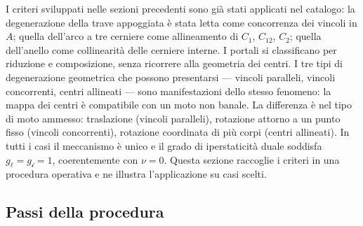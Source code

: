 I criteri sviluppati nelle sezioni precedenti sono già
stati applicati nel catalogo: la degenerazione della trave
appoggiata è stata letta come concorrenza dei vincoli in
$A$; quella dell'arco a tre cerniere come allineamento di
$C_1$, $C_{12}$, $C_2$; quella dell'anello come collinearità
delle cerniere interne. I portali si classificano per
riduzione e composizione, senza ricorrere alla geometria
dei centri. I tre tipi di degenerazione geometrica che
possono presentarsi --- vincoli paralleli,\label{sec:vincoli_paralleli}
vincoli concorrenti,\label{sec:vincoli_concorrenti}
centri allineati\label{sec:centri_allineati} ---
sono manifestazioni dello stesso fenomeno: la mappa
dei centri è compatibile con un moto non banale.
La differenza è nel tipo di moto ammesso: traslazione
(vincoli paralleli), rotazione attorno a un punto fisso
(vincoli concorrenti), rotazione coordinata di più corpi
(centri allineati). In tutti i casi il meccanismo è unico
e il grado di iperstaticità duale soddisfa
$g_\ell = g_{\mathscr{i}} = 1$, coerentemente con $\nu = 0$.
Questa sezione raccoglie i criteri in una procedura
operativa e ne illustra l'applicazione su casi scelti.

\subsection{Passi della procedura}
\label{sec:passi_ispezione}

